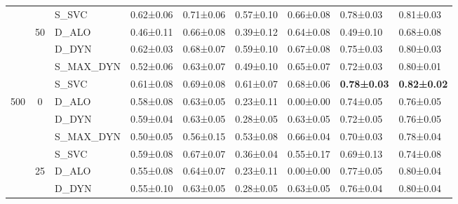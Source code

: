 \begin{landscape}
\begin{table}[H]
\begin{tabular}{cclllllll}
							        &                                   & S\_SVC                    & 0.62±0.06         & 0.71±0.06     & 0.57±0.10         & 0.66±0.08     & 0.78±0.03         & 0.81±0.03         \\ \cline{2-9}
							        & \multirow{4}{*}{50}               & D\_ALO                    & 0.46±0.11         & 0.66±0.08     & 0.39±0.12         & 0.64±0.08     & 0.49±0.10         & 0.68±0.08         \\
							        &                                   & D\_DYN                    & 0.62±0.03         & 0.68±0.07     & 0.59±0.10         & 0.67±0.08     & 0.75±0.03         & 0.80±0.03         \\
							        &                                   & S\_MAX\_DYN               & 0.52±0.06         & 0.63±0.07     & 0.49±0.10         & 0.65±0.07     & 0.72±0.03         & 0.80±0.01         \\ 
		                            &                                   & S\_SVC                    & 0.61±0.08         & 0.69±0.08     & 0.61±0.07         & 0.68±0.06     & \textbf{0.78±0.03}& \textbf{0.82±0.02}\\ \midrule
		\multirow{12}{*}{500}       & \multirow{4}{*}{0}                & D\_ALO                    & 0.58±0.08         & 0.63±0.05     & 0.23±0.11         & 0.00±0.00     & 0.74±0.05         & 0.76±0.05         \\
							        &                                   & D\_DYN                    & 0.59±0.04         & 0.63±0.05     & 0.28±0.05         & 0.63±0.05     & 0.72±0.05         & 0.76±0.05         \\
							        &                                   & S\_MAX\_DYN               & 0.50±0.05         & 0.56±0.15     & 0.53±0.08         & 0.66±0.04     & 0.70±0.03         & 0.78±0.04         \\
							        &                                   & S\_SVC                    & 0.59±0.08         & 0.67±0.07     & 0.36±0.04         & 0.55±0.17     & 0.69±0.13         & 0.74±0.08         \\ \cline{2-9}
							        & \multirow{4}{*}{25}               & D\_ALO                    & 0.55±0.08         & 0.64±0.07     & 0.23±0.11         & 0.00±0.00     & 0.77±0.05         & 0.80±0.04         \\
							        &                                   & D\_DYN                    & 0.55±0.10         & 0.63±0.05     & 0.28±0.05         & 0.63±0.05     & 0.76±0.04         & 0.80±0.04         \\

\end{tabular}
\end{table}
\end{landscape}
